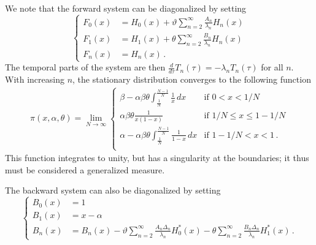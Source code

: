 \documentclass[preprint]{elsarticle}
\begin{document}
{We note that the forward system can be diagonalized by setting 
\begin{equation}\label{eq:forw_bound_diag}
\begin{cases}
    F_0(x)&=H_0(x)+\vartheta \sum_{n=2}^\infty \frac{A_n}{\lambda_n}H_n(x)\\
    F_1(x)&=H_1(x)+\theta \sum_{n=2}^\infty \frac{B_n}{\lambda_n} H_n(x)\\
    F_n(x)&=H_n(x)\,.
\end{cases}
\end{equation}
The temporal parts of the system are then $\frac{d}{d\tau} T_n(\tau)= -\lambda_n T_n(\tau)$ for all $n$. With increasing $n$, the stationary distribution converges to the following function \citep{Vogl15,Vogl16}
\begin{align}\label{eq:forw_bounddrift-stat}
  \pi(x, \alpha, \theta) = \lim_{N\to\infty}
  \begin{cases}
    \beta-\alpha\beta\theta \int_{\tfrac1N}^{\tfrac{N-1}N} \frac1x\,dx     & \text{if } 0 < x < 1/N         \\
    \alpha\beta\theta\frac{1}{x(1-x)}                                                 & \text{if } 1/N \le x \le 1-1/N \\
    \alpha-\alpha\beta\theta \int_{\tfrac1N}^{\tfrac{N-1}N} \frac1{1-x}\,dx  & \text{if } 1-1/N < x < 1 \,.      \\
\end{cases}
\end{align}
This function integrates to unity, but has a singularity at the boundaries; it thus must be considered a generalized measure. 

The backward system can also be diagonalized by setting
\begin{equation}\label{eq:backw_bound_diag}
\begin{cases}
    B_0(x)&=1\\
    B_1(x)&=x-\alpha\\
    B_n(x)&=B_n(x)-\vartheta \sum_{n=2}^\infty\frac{A_n\Delta_n}{\lambda_n} H_0^{*}(x)-\theta\sum_{n=2}^\infty \frac{B_n\Delta_n}{\lambda_n} H_1^{*}(x)\,.
\end{cases}
\end{equation}

}
\end{document}
